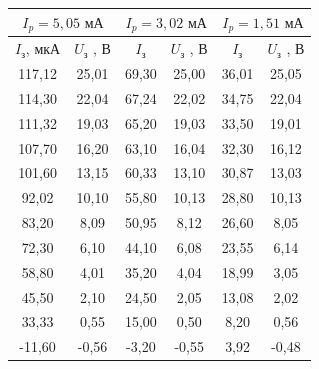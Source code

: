 \documentclass[a4paper, 12pt]{article}
\begin{document}
    \begin{table}[H]
        \centering
        \begin{tabular}{|cc|cc|cc|}
        \hline
        \multicolumn{2}{|c|}{$I_p = 5,05 \text{ мА}$} & \multicolumn{2}{c|}{$I_p = 3,02 \text{ мА}$} & \multicolumn{2}{c|}{$I_p = 1,51 \text{ мА}$} \\ \hline
        \multicolumn{1}{|c|}{$I_\text{з}$, мкА} & $U_\text{з}$ , В & \multicolumn{1}{c|}{$I_\text{з}$} & $U_\text{з}$ , В & \multicolumn{1}{c|}{$I_\text{з}$} & $U_\text{з}$ , В \\ \hline
        \multicolumn{1}{|c|}{117,12} & 25,01 & \multicolumn{1}{c|}{69,30} & 25,00 & \multicolumn{1}{c|}{36,01} & 25,05 \\ \hline
        \multicolumn{1}{|c|}{114,30} & 22,04 & \multicolumn{1}{c|}{67,24} & 22,02 & \multicolumn{1}{c|}{34,75} & 22,04 \\ \hline
        \multicolumn{1}{|c|}{111,32} & 19,03 & \multicolumn{1}{c|}{65,20} & 19,03 & \multicolumn{1}{c|}{33,50} & 19,01 \\ \hline
        \multicolumn{1}{|c|}{107,70} & 16,20 & \multicolumn{1}{c|}{63,10} & 16,04 & \multicolumn{1}{c|}{32,30} & 16,12 \\ \hline
        \multicolumn{1}{|c|}{101,60} & 13,15 & \multicolumn{1}{c|}{60,33} & 13,10 & \multicolumn{1}{c|}{30,87} & 13,03 \\ \hline
        \multicolumn{1}{|c|}{92,02} & 10,10 & \multicolumn{1}{c|}{55,80} & 10,13 & \multicolumn{1}{c|}{28,80} & 10,13 \\ \hline
        \multicolumn{1}{|c|}{83,20} & 8,09 & \multicolumn{1}{c|}{50,95} & 8,12 & \multicolumn{1}{c|}{26,60} & 8,05 \\ \hline
        \multicolumn{1}{|c|}{72,30} & 6,10 & \multicolumn{1}{c|}{44,10} & 6,08 & \multicolumn{1}{c|}{23,55} & 6,14 \\ \hline
        \multicolumn{1}{|c|}{58,80} & 4,01 & \multicolumn{1}{c|}{35,20} & 4,04 & \multicolumn{1}{c|}{18,99} & 3,05 \\ \hline
        \multicolumn{1}{|c|}{45,50} & 2,10 & \multicolumn{1}{c|}{24,50} & 2,05 & \multicolumn{1}{c|}{13,08} & 2,02 \\ \hline
        \multicolumn{1}{|c|}{33,33} & 0,55 & \multicolumn{1}{c|}{15,00} & 0,50 & \multicolumn{1}{c|}{8,20} & 0,56 \\ \hline
        \multicolumn{1}{|c|}{-11,60} & -0,56 & \multicolumn{1}{c|}{-3,20} & -0,55 & \multicolumn{1}{c|}{3,92} & -0,48 \\ \hline

\end{tabular}
\end{table}
\end{document}
